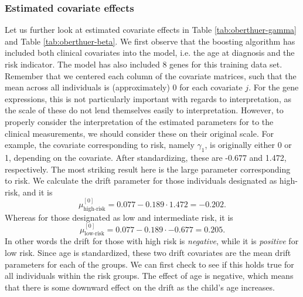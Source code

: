 \subsubsection{Estimated covariate effects}
Let us further look at estimated covariate effects in Table \ref{tab:oberthuer-gamma} and Table \ref{tab:oberthuer-beta}.
We first observe that the boosting algorithm has included both clinical covariates into the model, i.e. the age at diagnosis and the risk indicator.
The model has also included 8 genes for this training data set.
Remember that we centered each column of the covariate matrices, such that the mean across all individuals is (approximately) 0 for each covariate $j$.
For the gene expressions, this is not particularly important with regards to interpretation, as the scale of these do not lend themselves easily to interpretation.
However, to properly consider the interpretation of the estimated parameters for to the clinical measurements, we should consider these on their original scale.
For example, the covariate corresponding to risk, namely $\gamma_1$, is originally either 0 or 1, depending on the covariate.
After standardizing, these are -0.677 and 1.472, respectively.
The most striking result here is the large parameter corresponding to risk.
We calculate the drift parameter for those individuals designated as high-risk, and it is
\begin{equation*}
    \mu^{[0]}_{\text{high-risk}}=0.077-0.189\cdot1.472=-0.202.
\end{equation*}
Whereas for those designated as low and intermediate risk, it is
\begin{equation*}
    \mu^{[0]}_{\text{low-risk}}=0.077-0.189\cdot-0.677=0.205.
\end{equation*}
In other words the drift for those with high risk is \textit{negative}, while it is \textit{positive} for low risk.
Since age is standardized, these two drift covariates are the mean drift parameters for each of the groups.
We can first check to see if this holds true for all individuals within the risk groups.
The effect of age is negative, which means that there is some downward effect on the drift as the child's age increases.
